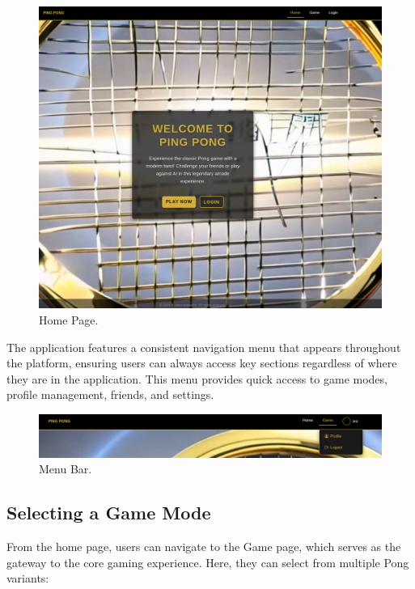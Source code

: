 \begin{figure}[H]
    \centering
    \includegraphics[width=0.7\linewidth]{Figures/images/new_images/HomePage.png}
    \caption{Home Page.} %
    \label{fig:home-page-journey}
\end{figure}

The application features a consistent navigation menu that appears throughout the platform, ensuring users can always access key sections regardless of where they are in the application. This menu provides quick access to game modes, profile management, friends, and settings.

\begin{figure}[H]
    \centering
    \includegraphics[width=0.65\linewidth]{Figures/images/new_images/MenuBar.png}
    \caption{Menu Bar.} %
    \label{fig:menu-bar-journey}
\end{figure}

\subsection{Selecting a Game Mode}

From the home page, users can navigate to the Game page, which serves as the gateway to the core gaming experience. Here, they can select from multiple Pong variants:

